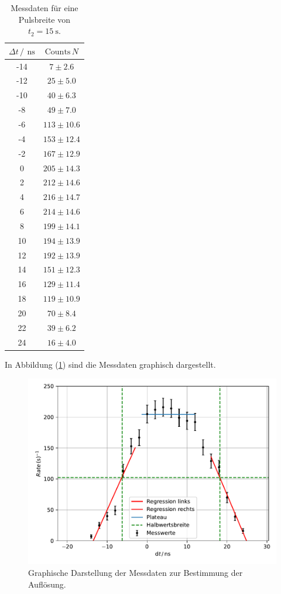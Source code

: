 \begin{table}
  \centering
  \caption{Messdaten für eine Pulsbreite von $t_\mathrm{2}=\SI{15}{\second}$.}
  \label{tab:tab2}
  \begin{tabular}{c c}
    \toprule
		$\Delta t\, / \, \SI{}{\nano\second}$ & $\mathrm{Counts} \, N$ \\
    \midrule
		-14 & $7\pm2.6$ \\
		-12 & $25\pm5.0$ \\
		-10 & $40\pm6.3$ \\
		-8 & $49\pm7.0$ \\
		-6 & $113\pm10.6$ \\
		-4 & $153\pm12.4$ \\
		-2 & $167\pm12.9$ \\
		0  & $205\pm14.3$ \\
		2 & $212\pm14.6$ \\
		4 & $216\pm14.7$ \\
		6 & $214\pm14.6$ \\
		8 & $199\pm14.1$ \\
		10 & $194\pm13.9$ \\
		12 & $192\pm13.9$ \\
		14 & $151\pm12.3$ \\
		16 & $129\pm11.4$ \\
		18 & $119\pm10.9$ \\
		20 & $70\pm8.4$ \\
		22 & $39\pm6.2$ \\
		24 & $16\pm4.0$ \\
    \bottomrule
  \end{tabular}
\end{table}
\FloatBarrier
\noindent In Abbildung (\ref{fig:plateau2}) sind die Messdaten graphisch dargestellt.
\begin{figure}
	\centering
	\includegraphics[scale=0.7]{fig/Plateau2.pdf}
	\caption{Graphische Darstellung der Messdaten zur Bestimmung der Auflösung.}
	\label{fig:plateau2}
\end{figure}
